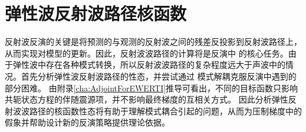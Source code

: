 \section{弹性波反射波路径核函数}
反射波反演的关键是将预测的与观测的反射波之间的残差反投影到反射波路径上，从而实现对模型的更新。因此，反射波波路径的计算将是反演中
的核心任务。由于弹性波中存在各种模式转换，所以反射波波路径的复杂程度远大于声波中的情况。首先分析弹性波反射波路径的性态，并尝试通过
模式解耦克服反演中遇到的部分困难。
由附录\ref{cha:AdjointForEWERTI}推导可看出，不同的目标函数只影响共轭状态方程的伴随震源项，并不影响最终梯度的互相关方式。
因此分析弹性反射波波路径的核函数性态将有助于理解模式耦合引起的问题，从而为压制梯度中的假象并帮助设计新的反演策略提供理论依据。
\begin{figure}[!htb]
   \centering
   \\

\end{figure}
